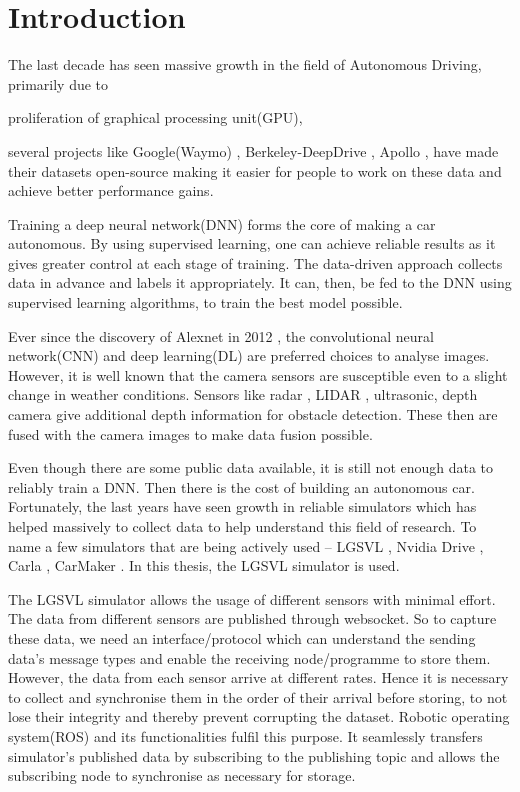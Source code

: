 \chapter{Introduction}

The last decade has seen massive growth in the field of Autonomous
Driving, primarily due to 
\begin{enumerate*}[label= \alph*)]
    \item proliferation of graphical processing unit(GPU),

    \item several projects like Google(Waymo) \cite{Waymo},
        Berkeley-DeepDrive \cite{Berkeley-DeepDrive},
        Apollo \cite{Apollo}, have made their datasets open-source making it
        easier for people to work on these data and achieve better performance gains. 
\end{enumerate*}



Training a deep neural network(DNN) forms the core of making a car autonomous. 
By using supervised learning, one can achieve reliable results as it gives greater control
at each stage of training. The data-driven approach collects data in advance and labels it
appropriately. It can, then, be fed to the DNN using supervised
learning algorithms, to train the best model possible. 

Ever since the discovery of Alexnet in 2012 \cite{Alexnet2012}, the convolutional neural network(CNN) and
deep learning(DL) are preferred choices to analyse images.  However, it is well known that the camera sensors are susceptible even to a slight change in weather conditions. 
 Sensors like radar \cite{Radar}, LIDAR \cite{LIDAR}, ultrasonic, depth camera
give additional depth information for obstacle detection. These then are fused with the camera images to make
data fusion possible. 

Even though there are some public data available, it is still not enough data to reliably
train a DNN. Then there is  the cost of building an autonomous car. Fortunately, the last
years have seen growth in reliable simulators which
has helped massively to collect data to help understand this field of research.
To name a few simulators that are being actively used -- LGSVL \cite{LGSVL}, Nvidia Drive
\cite{NvidiaSimulator}, Carla \cite{CarlaSimulator}, CarMaker \cite{CarMaker}. 
In this thesis, the LGSVL simulator is used.

The LGSVL simulator allows the usage of different sensors with minimal effort. The data
from different sensors are published through websocket. So to capture these data, we
need an interface/protocol which can understand the sending data's message types and enable the
receiving node/programme to store them. However, the data from each sensor arrive at
different rates. Hence it is necessary to collect and synchronise them in the order of their arrival
before storing, to not lose their integrity and thereby prevent corrupting the dataset.
Robotic operating system(ROS) \cite{ROS2} and its functionalities fulfil
this purpose. It seamlessly transfers simulator's published data by subscribing to the
publishing topic and allows the subscribing node to synchronise as necessary for storage.

